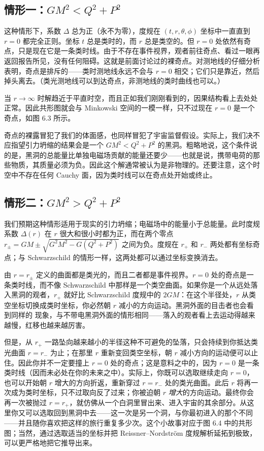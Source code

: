 \subsection*{情形一：$GM^{2}<Q^{2}+P^{2}$}

这种情形下，系数 $\Delta$ 总为正（永不为零），度规在 $(t,r,\theta,\phi)$ 坐标中一直直到 $r=0$ 都完全正则。坐标 $t$ 总是类时的，而 $r$ 总是类空的。但 $r=0$ 处依然有奇点，只是现在它是一条类时线。由于不存在事件视界，观者前往奇点、看过一眼再返回报告所见，没有任何阻碍。这就是前面讨论过的裸奇点。对测地线的仔细分析表明，奇点是排斥的——类时测地线永远不会与 $r=0$ 相交；它们只是靠近，然后掉头离去。（类光测地线可以到达奇点，非测地线的类时曲线也可以。）


当 $r\to\infty$ 时解趋近于平直时空，而且正如我们刚刚看到的，因果结构看上去处处正常。因此共形图就会与 Minkowski 空间的一模一样，只不过现在 $r=0$ 是一个奇点，如图 6.3 所示。

奇点的裸露冒犯了我们的体面感，也同样冒犯了宇宙监督假设。实际上，我们决不应指望引力坍缩的结果会是一个 $GM^{2}<Q^{2}+P^{2}$ 的黑洞。粗略地说，这个条件说的是，黑洞的总能量比单独电磁场贡献的能量还要少——也就是说，携带电荷的那些物质，其质量必须为负。因此这个解通常被认为是非物理的。还要注意，这个时空中不存在任何 Cauchy 面，因为类时线可以在奇点处开始或终止。

\subsection*{情形二：$GM^{2}>Q^{2}+P^{2}$}

我们预期这种情形适用于现实的引力坍缩；电磁场中的能量小于总能量。此时度规系数 $\Delta(r)$ 在 $r$ 很大和很小时都为正，而在两个零点 $r_{\pm}=GM\pm\sqrt{G^{2}M^{2}-G(Q^{2}+P^{2})}$ 之间为负。度规在 $r_{+}$ 和 $r_{-}$ 两处都有坐标奇点；与 Schwarzschild 的情形一样，这两处都可以通过坐标变换消去。

由 $r=r_{\pm}$ 定义的曲面都是类光的，而且二者都是事件视界。$r=0$ 处的奇点是一条类时线，而不像 Schwarzschild 中那样是一个类空曲面。如果你是一个从远处落入黑洞的观者，$r_{+}$ 就好比 Schwarzschild 度规中的 $2GM$：在这个半径处，$r$ 从类空坐标切换成类时坐标，你必然朝 $r$ 减小的方向运动。黑洞外面的目击者也会看到同样的
现象，与不带电黑洞外面的情形相同——落入的观者看上去运动得越来越慢，红移也越来越厉害。

但是，从 $r_{+}$ 一路坠向越来越小的半径这种不可避免的坠落，只会持续到你抵达类光曲面 $r=r_{-}$ 为止；在那里 $r$ 重新变回类空坐标，朝 $r$ 减小方向的运动便可以止住。因此你并不一定要撞上 $r=0$ 处的奇点；这是意料之中的，因为 $r=0$ 是一条类时线（因而未必处在你的未来之中）。实际上，你既可以选取继续走向 $r=0$，也可以开始朝 $r$ 增大的方向折返，重新穿过 $r=r_{-}$ 处的类光曲面。此后 $r$ 将再一次成为类时坐标，只不过取向反了过来；你被迫朝 $r$ \emph{增大}的方向运动。最终你会再一次被抛过 $r=r_{+}$，就仿佛从一个白洞里冒出来、进入宇宙的其余部分。从这里你又可以选取回到黑洞中去——这一次是另一个洞，与你最初进入的那个不同——并且随你喜欢把这样的旅行重复多少次。这个小故事对应于图 6.4 中的共形图；当然，通过选取适当的坐标并把 Reissner–Nordström 度规解析延拓到极致，可以更严格地把它推导出来。

